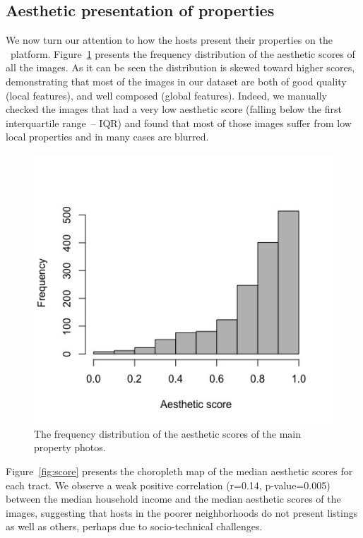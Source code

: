 \subsection{Aesthetic presentation of properties}
We now turn our attention to how the hosts present their properties on the \ab \ platform. Figure~\ref{fig:aes} presents the frequency distribution of the aesthetic scores of all the images. As it can be seen the distribution is skewed toward higher scores, demonstrating that most of the images in our dataset are both of good quality (local features), and well composed (global features). Indeed, we manually checked the images that had a very low aesthetic score (falling below the first interquartile range~-- IQR) and found that most of those images suffer from low local properties and in many cases are blurred. 

\begin{figure}[!h]
\begin{center}
\includegraphics[scale=0.3]{pics/Hist-aes.jpeg}
\caption{The frequency distribution of the aesthetic scores of the main property photos. }
\label{fig:aes}
\end{center}
\end{figure}

Figure~\ref{fig:score} presents the choropleth map of the median aesthetic scores for each tract. We observe a weak positive correlation (r=0.14, p-value=0.005) between the median household income and the median aesthetic scores of the images, suggesting that hosts in the poorer neighborhoods do not present listings as well as others, perhaps due to socio-technical challenges. 

